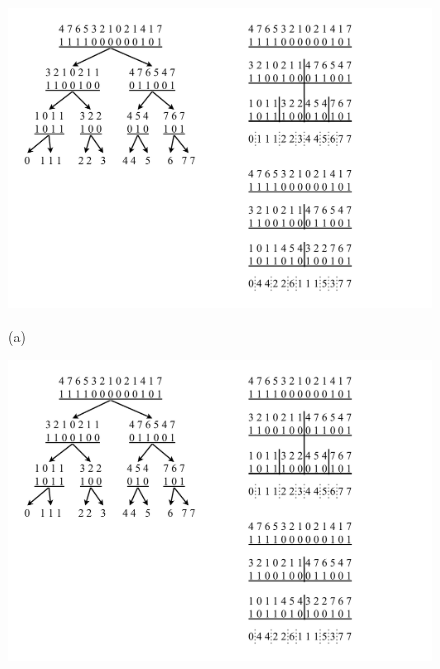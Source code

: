 \begin{figure}%
    	\centering
    	\begin{minipage}{0.3\textwidth}
    		\centering
    		\includegraphics[scale=.4, clip,  trim=30 280 440 30]{img/arte/graphs-wavelet-matrix.pdf}
    		
    		(a)
    	\end{minipage}
    	\begin{minipage}{0.3\textwidth}
    		\centering
    		\includegraphics[scale=.45, clip, trim=470 320 170 30]{img/arte/graphs-wavelet-matrix.pdf}


\end{minipage}
\end{figure}
